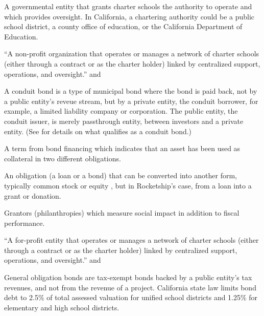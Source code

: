 \begin{description}[nosep]
\medskip\item[charter school authorizer] A governmental entity that grants charter schools the authority to operate and which provides oversight. In California, a chartering authority could be a public school district, a county office of education, or the California Department of Education. \parencite{NACSA2024}

\medskip\item[charter management organization (CMO)] ``A non-profit organization that operates or manages a network of charter schools (either through a contract or as the charter holder) linked by centralized support, operations, and oversight.'' \parencite[2]{USDoEd2021} and \parencite{CDE2021b}

\medskip\item[conduit bond] A conduit bond is a type of municipal bond where the bond is paid back, not by a public entity's reveue stream, but by a private entity, the conduit borrower, for example, a limited liability company or corporation. The public entity, the conduit issuer, is merely passthrough entity, between investors and a private entity. \parencite{Cooper2017} (See \textcite{GASB91_2019} for details on what qualifies as a conduit bond.) %

\medskip\item[cross-collateralization] A term from bond financing which indicates that an asset has been used as collateral in two different obligations. \parencite{Lipn.d.}

\medskip\item[debt, convertible] An obligation (a loan or a bond) that can be converted into another form, typically common stock or equity \parencite{Chen2020}, but in Rocketship's case, from a loan into a grant or donation.

\medskip\item[double bottom line grantors] Grantors (philanthropies) which measure social impact in addition to fiscal performance. \parencite{Clark.etal2015}

\medskip\item[education management organization (EMO)] ``A for-profit entity that operates or manages a network of charter schools (either through a contract or as the charter holder) linked by centralized support, operations, and oversight.'' \parencite[2]{USDoEd2021} and \parencite{CDE2021b} %

\medskip\item[general obligation bonds (GO)] General obligation bonds are tax-exempt bonds backed by a public entity's tax revenues, and not from the revenue of a project. California state law limits bond debt to 2.5\% of total assessed valuation for unified school districts and 1.25\% for elementary and high school districts. \parencite{CDIAC2014}


\end{description}
